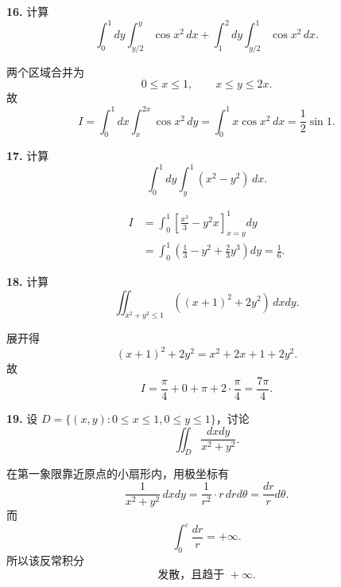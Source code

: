 \begin{problemblock}
\textbf{16.} 计算
\[
\int_0^1dy\int_{y/2}^{y}\cos x^2\,dx
+\int_1^2dy\int_{y/2}^{1}\cos x^2\,dx.
\]
\end{problemblock}

\begin{solutionblock}
两个区域合并为
\[
0\le x\le1,\qquad x\le y\le2x.
\]
故
\[
I=\int_0^1dx\int_x^{2x}\cos x^2\,dy
=\int_0^1x\cos x^2\,dx
=\boxed{\frac12\sin1}.
\]
\end{solutionblock}

\begin{problemblock}
\textbf{17.} 计算
\[
\int_0^1dy\int_y^1(x^2-y^2)\,dx.
\]
\end{problemblock}

\begin{solutionblock}
\[
\begin{aligned}
I&=\int_0^1\left[\frac{x^3}{3}-y^2x\right]_{x=y}^{1}dy\\
&=\int_0^1\left(\frac13-y^2+\frac23y^3\right)dy
=\boxed{\frac16}.
\end{aligned}
\]
\end{solutionblock}

\begin{problemblock}
\textbf{18.} 计算
\[
\iint_{x^2+y^2\le1}\left((x+1)^2+2y^2\right)\,dxdy.
\]
\end{problemblock}

\begin{solutionblock}
展开得
\[
(x+1)^2+2y^2=x^2+2x+1+2y^2.
\]
故
\[
I=\frac{\pi}{4}+0+\pi+2\cdot\frac{\pi}{4}
=\boxed{\frac{7\pi}{4}}.
\]
\end{solutionblock}

\begin{problemblock}
\textbf{19.} 设 \(D=\{(x,y):0\le x\le1,0\le y\le1\}\)，讨论
\[
\iint_D\frac{dxdy}{x^2+y^2}.
\]
\end{problemblock}

\begin{solutionblock}
在第一象限靠近原点的小扇形内，用极坐标有
\[
\frac{1}{x^2+y^2}\,dxdy=\frac1{r^2}\cdot r\,drd\theta=\frac{dr}{r}d\theta.
\]
而
\[
\int_0^\varepsilon\frac{dr}{r}=+\infty.
\]
所以该反常积分
\[
\boxed{\text{发散，且趋于 }+\infty}.
\]
\end{solutionblock}

